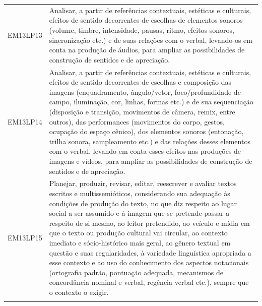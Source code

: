 \documentclass[12pt]{extarticle}
\begin{document}
\begin{longtable}{ll}
EM13LP13   & Analisar, a partir de referências contextuais, estéticas e culturais, efeitos de sentido decorrentes de escolhas de elementos sonoros (volume, timbre, intensidade, pausas, ritmo, efeitos sonoros, sincronização etc.) e de suas relações com o verbal, levando-os em conta na produção de áudios, para ampliar as possibilidades de construção de sentidos e de apreciação.                                                                                                                                                                                                                                                                                                                                                                                                                                         \\
\rowcolor[HTML]{FFF} 
EM13LP14   & Analisar, a partir de referências contextuais, estéticas e culturais, efeitos de sentido decorrentes de escolhas e composição das imagens (enquadramento, ângulo/vetor, foco/profundidade de campo, iluminação, cor, linhas, formas etc.) e de sua sequenciação (disposição e transição, movimentos de câmera, remix, entre outros), das performances (movimentos do corpo, gestos, ocupação do espaço cênico), dos elementos sonoros (entonação, trilha sonora, sampleamento etc.) e das relações desses elementos com o verbal, levando em conta esses efeitos nas produções de imagens e vídeos, para ampliar as possibilidades de construção de sentidos e de apreciação.                                                                                                                                         \\
\rowcolor[HTML]{E0F7FA} 
EM13LP15   & Planejar, produzir, revisar, editar, reescrever e avaliar textos escritos e multissemióticos, considerando sua adequação às condições de produção do texto, no que diz respeito ao lugar social a ser assumido e à imagem que se pretende passar a respeito de si mesmo, ao leitor pretendido, ao veículo e mídia em que o texto ou produção cultural vai circular, ao contexto imediato e sócio-histórico mais geral, ao gênero textual em questão e suas regularidades, à variedade linguística apropriada a esse contexto e ao uso do conhecimento dos aspectos notacionais (ortografia padrão, pontuação adequada, mecanismos de concordância nominal e verbal, regência verbal etc.), sempre que o contexto o exigir.                                                                                            \\
\rowcolor[HTML]{FFF} 

\end{longtable}
\end{document}
